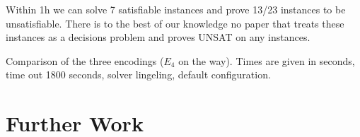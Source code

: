 \documentclass[]{llncs}
\begin{document}
Within 1h we can solve 7 satisfiable instances and prove 13/23 instances
to be unsatisfiable. There is to the best of our knowledge no paper that
treats these instances as a decisions problem and proves UNSAT on any
instances.

\begin{table}[htbp]
    \caption{Comparison of the three encodings ($E_4$ on the way). Times
    are given in seconds, time out 1800 seconds, solver lingeling, default configuration.}
    \centering
    
    \label{tab:3}
\end{table}

\section{Further Work}
\end{document}
